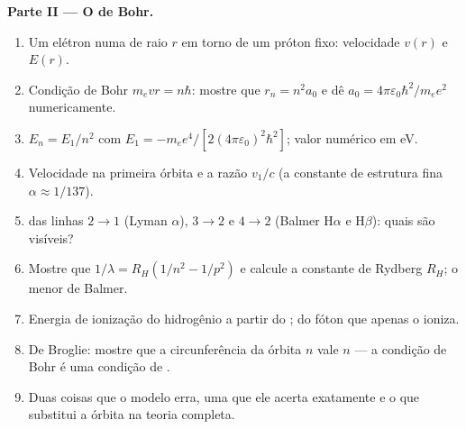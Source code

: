 \begin{problem}
\medskip
\noindent\textbf{Parte II --- O  de Bohr.}
\begin{enumerate}[resume]
  \item Um elétron numa  de raio $r$ em torno de um próton
        fixo: velocidade $v(r)$ e  $E(r)$.
  \item Condição de Bohr $m_evr = n\hbar$: mostre que $r_n = n^2a_0$ e dê
        $a_0 = 4\pi\varepsilon_0\hbar^2/m_ee^2$ numericamente.
  \item $E_n = E_1/n^2$ com $E_1 = -m_ee^4/[2(4\pi\varepsilon_0)^2\hbar^2]$;
        valor numérico em eV.
  \item Velocidade na primeira órbita e a razão $v_1/c$ (a
        constante de estrutura fina $\alpha \approx 1/137$).
  \item {} das linhas $2 \to 1$ (Lyman $\alpha$), $3 \to 2$ e
        $4 \to 2$ (Balmer H$\alpha$ e H$\beta$): quais são visíveis?
  \item Mostre que $1/\lambda = R_H(1/n^2 - 1/p^2)$ e calcule a constante de
        Rydberg $R_H$; o menor  de Balmer.
  \item Energia de ionização do hidrogênio a partir do ; 
        do fóton que apenas o ioniza.
  \item De Broglie: mostre que a circunferência da órbita $n$ vale $n$
         --- a condição de Bohr é uma condição de .
  \item Duas coisas que o modelo erra, uma que ele acerta exatamente
        e o que substitui a órbita na teoria completa.
\end{enumerate}


\end{problem}
